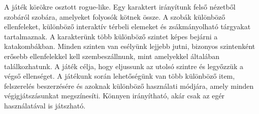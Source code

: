 
A játék körökre osztott rogue-like. Egy karaktert irányítunk felső nézetből szobáról szobára, amelyeket folyosók kötnek össze. A szobák különböző ellenfeleket, különböző interaktív térbeli elemeket és zsákmányolható tárgyakat tartalmaznak. A karakterünk több különböző szintet képes bejárni a katakombákban. Minden szinten van esélyünk lejjebb jutni, bizonyos szintenként erősebb ellenfelekkel kell szembeszállnunk, mint amelyekkel általában találkozhatunk. A játék célja, hogy eljussunk az utolsó szintre és legyőzzük a végső ellenséget. A játékunk során lehetőségünk van több különböző item, felszerelés beszerzésére és azoknak különböző használati módjára, amely minden végigjátszásunkat megszínesíti. Könnyen irányítható, akár csak az egér használatával is játszható.
